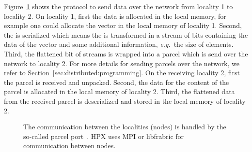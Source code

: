 Figure~\ref{fig:sending:network} shows the protocol to send data over the network from locality 1 to locality 2. On locality 1, first the data is allocated in the local memory, for example one could allocate the vector  in the local memory of locality 1. Second, the  is serialized which means the  is transformed in a stream of bits containing the data of the vector and some additional information, \emph{e.g.}\ the size of elements. Third, the flattened bit of streams is wrapped into a parcel which is send over the network to locality 2. For more details for sending parcels over the network, we refer to Section~\ref{sec:distributed:programming}. On the receiving locality 2, first the parcel is received and unpacked. Second, the data for the content of the parcel is allocated in the local memory of locality 2. Third, the flattened data from the received parcel is deserialized and stored in the local memory of locality 2. \\

\begin{figure}[tb]
\begin{center}
\end{center}
\caption{The communication between the localities (nodes) is handled by the so-called parcel port~\cite{kaiser2009parallex}. HPX uses MPI or libfrabric for communication between nodes.}
\label{fig:sending:network} 
\end{figure}

